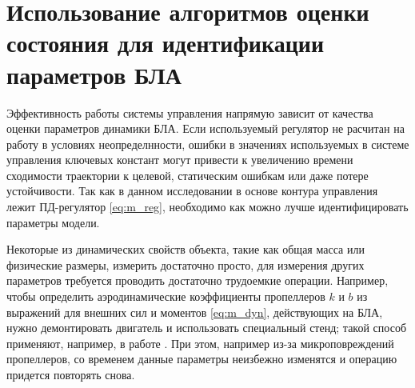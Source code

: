 \section{Использование алгоритмов оценки состояния для идентификации параметров БЛА}

Эффективность работы системы управления напрямую зависит от качества оценки параметров динамики БЛА.
Если используемый регулятор не расчитан на работу в условиях неопределнности, ошибки в значениях используемых в системе управления ключевых констант могут привести к увеличению времени сходимости траектории к целевой, статическим ошибкам или даже потере устойчивости.
Так как в данном исследовании в основе контура управления лежит ПД-регулятор \ref{eq:m_reg}, необходимо как можно лучше идентифицировать параметры модели. 

Некоторые из динамических свойств объекта, такие как общая масса или физические размеры, измерить достаточно просто, для измерения других параметров требуется проводить достаточно трудоемкие операции.
Например, чтобы определить аэродинамические коэффициенты пропеллеров
$k$ и $b$
из выражений для внешних сил и моментов \ref{eq:m_dyn}, действующих на БЛА,
нужно демонтировать двигатель и использовать специальный стенд; такой способ применяют, например, в работе \cite{Ryll01}. При этом, например из-за микроповреждений пропеллеров, со временем данные параметры неизбежно изменятся и операцию придется повторять снова.

